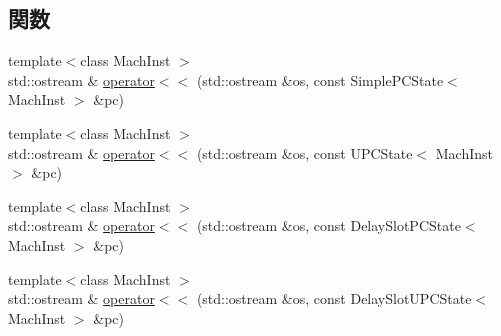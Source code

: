 \subsection*{関数}
\begin{DoxyCompactItemize}
\item 
{\footnotesize template$<$class MachInst $>$ }\\std::ostream \& \hyperlink{namespaceGenericISA_a960fce0270870fc775ac34cc401036ba}{operator$<$$<$} (std::ostream \&os, const SimplePCState$<$ MachInst $>$ \&pc)
\item 
{\footnotesize template$<$class MachInst $>$ }\\std::ostream \& \hyperlink{namespaceGenericISA_ad7647a2fd4c0b3a52c3039868605af36}{operator$<$$<$} (std::ostream \&os, const UPCState$<$ MachInst $>$ \&pc)
\item 
{\footnotesize template$<$class MachInst $>$ }\\std::ostream \& \hyperlink{namespaceGenericISA_a1ee53cba61e057cc025be65f71694001}{operator$<$$<$} (std::ostream \&os, const DelaySlotPCState$<$ MachInst $>$ \&pc)
\item 
{\footnotesize template$<$class MachInst $>$ }\\std::ostream \& \hyperlink{namespaceGenericISA_a07062a2b0f755aa5b023fb796d2dceed}{operator$<$$<$} (std::ostream \&os, const DelaySlotUPCState$<$ MachInst $>$ \&pc)
\end{DoxyCompactItemize}
